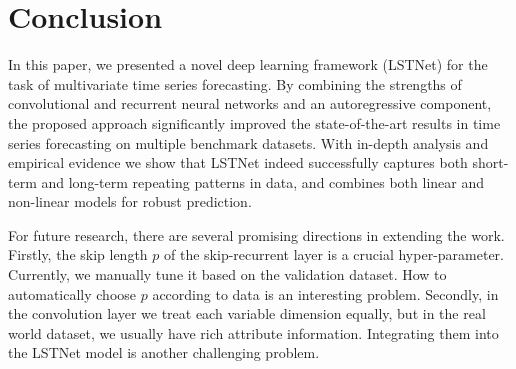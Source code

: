 \section{Conclusion}
\label{sec:conclusion}
In this paper, we presented a novel deep learning framework (LSTNet) for the task of multivariate time series forecasting. By combining the strengths of convolutional and recurrent neural networks and an autoregressive component, the proposed approach significantly improved the state-of-the-art results in time series forecasting on multiple benchmark datasets. With in-depth analysis and empirical evidence we show that LSTNet indeed successfully captures both short-term and long-term repeating patterns in data, and combines both linear and non-linear models for robust prediction.  

For future research, there are several promising directions in extending the work. Firstly, the skip length $p$ of the skip-recurrent layer is a crucial hyper-parameter. Currently, we manually tune it based on the validation dataset. How to automatically choose $p$ according to data is an interesting problem. Secondly, in the convolution layer we treat each variable dimension equally, but in the real world dataset, we usually have rich attribute information. Integrating them into the LSTNet model is another challenging problem.  
